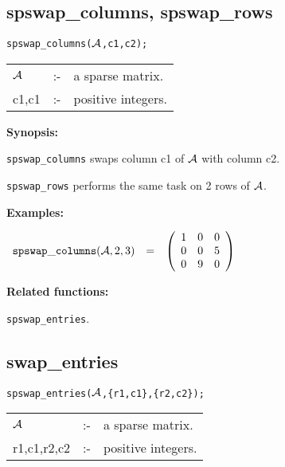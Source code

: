 \subsection{spswap\_columns, spswap\_rows}

\hspace*{0.175in} {\tt spswap\_columns(${\cal A}$,c1,c2);}

\hspace*{0.1in} 
\begin{tabular}{l l l}
${\cal A}$ &:-& a sparse matrix. \\
c1,c1      &:-& positive integers. 
\end{tabular}

{\bf Synopsis:} 

\hspace*{0.175in} 
{\tt spswap\_columns} swaps column c1 of ${\cal A}$ with column c2. 

\hspace*{0.175in} {\tt spswap\_rows} performs the same task on 2 rows of 
                ${\cal A}$.

{\bf Examples:}

\begin{flushleft}  
\hspace*{0.1in}
\begin{math}  
\begin{array}{ccc}
{\tt spswap\_columns}({\cal A},2,3) & = & 
        \left( \begin{array}{ccc} 1 & 0 & 0 \\ 0 & 0 & 5 \\ 0 & 9 & 0
 \end{array} \right) 
\end{array}
\end{math}  
\end{flushleft}

{\bf Related functions:}

\hspace*{0.175in} {\tt spswap\_entries}.


\subsection{swap\_entries}

\hspace*{0.175in} {\tt spswap\_entries(${\cal A}$,\{r1,c1\},\{r2,c2\});}

\hspace*{0.1in}  
\begin{tabular}{l l l} 
${\cal A}$  &:-& a sparse matrix. \\
r1,c1,r2,c2 &:-& positive integers.
\end{tabular}


